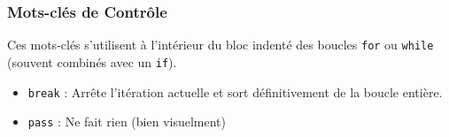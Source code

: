 \subsubsection{Mots-clés de Contrôle}

Ces mots-clés s'utilisent à l'intérieur du bloc indenté des boucles \texttt{for} ou \texttt{while} (souvent combinés avec un \texttt{if}).

\begin{itemize}
\item \texttt{break} : Arrête l'itération actuelle et sort définitivement de la boucle entière.
\item \texttt{pass} : Ne fait rien (bien visuelment)
\end{itemize}